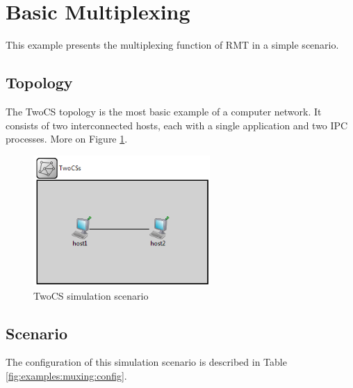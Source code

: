     \section{Basic Multiplexing}

        This example presents the multiplexing function of RMT in a simple scenario.

        \subsection{Topology}

            The TwoCS topology is the most basic example of a computer network. It consists of two interconnected hosts, each with a single application and two IPC processes. More on Figure \ref{fig:examples:muxing:events:topology}.

            \begin{figure}[H]
                \begin{center}
                    \includegraphics[width=0.6\textwidth]{fig/examples-twocs.png}
                  \caption{TwoCS simulation scenario}
                  \label{fig:examples:muxing:events:topology}
                \end{center}
            \end{figure}

        \subsection{Scenario}

            The configuration of this simulation scenario is described in Table \ref{fig:examples:muxing:config}.

